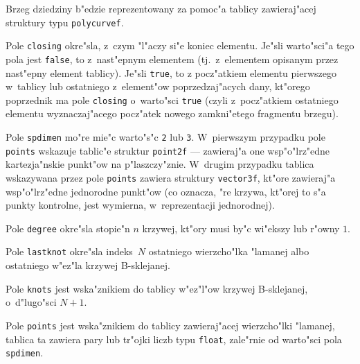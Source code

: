 \vspace{\medskipamount}
Brzeg dziedziny b"edzie reprezentowany za pomoc"a tablicy zawieraj"acej
struktury typu \texttt{polycurvef}.

\vspace{\bigskipamount}
Pole \texttt{closing} okre"sla, z~czym "l"aczy si"e koniec elementu. Je"sli
warto"sci"a tego pola jest \texttt{false}, to z~nast"epnym elementem (tj.\
z~elementem opisanym przez nast"epny element tablicy). Je"sli \texttt{true},
to z pocz"atkiem elementu pierwszego w~tablicy lub ostatniego
z~element"ow poprzedzaj"acych dany, kt"orego poprzednik ma pole
\texttt{closing} o~warto"sci \texttt{true} (czyli z~pocz"atkiem
ostatniego elementu wyznaczaj"acego pocz"atek nowego zamkni"etego
fragmentu brzegu).

\begin{sloppypar}
Pole \texttt{spdimen} mo"re mie"c warto"s"c \texttt{2} lub \texttt{3}.
W~pierwszym przypadku pole \texttt{points} wskazuje tablic"e struktur
\texttt{point2f} --- zawieraj"a one wsp"o"lrz"edne kartezja"nskie punkt"ow
na p"laszczy"znie. W~drugim przypadku tablica wskazywana przez pole
\texttt{points} zawiera struktury \texttt{vector3f}, kt"ore zawieraj"a
wsp"o"lrz"edne jednorodne punkt"ow (co oznacza, "re krzywa, kt"orej to s"a
punkty kontrolne, jest wymierna, w~reprezentacji jednorodnej).
\end{sloppypar}

Pole \texttt{degree} okre"sla stopie"n $n$ krzywej, kt"ory musi by"c wi"ekszy
lub r"owny $1$.

Pole \texttt{lastknot} okre"sla indeks~$N$ ostatniego wierzcho"lka "lamanej
albo ostatniego w"ez"la krzywej B-sklejanej.

Pole \texttt{knots} jest wska"znikiem do tablicy w"ez"l"ow krzywej
B-sklejanej, o~d"lugo"sci $N+1$.

Pole \texttt{points} jest wska"znikiem do tablicy zawieraj"acej wierzcho"lki
"lamanej, tablica ta zawiera pary lub tr"ojki liczb typu \texttt{float},
zale"rnie od warto"sci pola \texttt{spdimen}.

